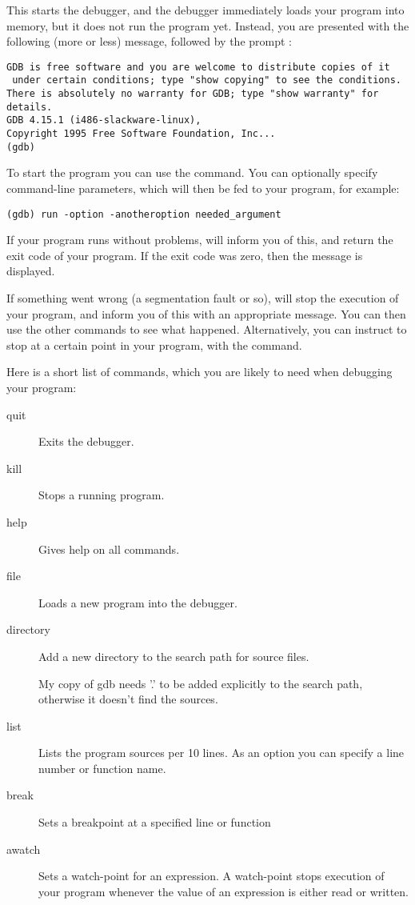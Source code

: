 This starts the debugger, and the debugger immediately loads your program
into memory, but it does not run the program yet. Instead, you are presented
with the following (more or less) message, followed by the  prompt
:
\begin{verbatim}
GDB is free software and you are welcome to distribute copies of it
 under certain conditions; type "show copying" to see the conditions.
There is absolutely no warranty for GDB; type "show warranty" for details.
GDB 4.15.1 (i486-slackware-linux),
Copyright 1995 Free Software Foundation, Inc...
(gdb)
\end{verbatim}
To start the program you can use the  command. You can optionally
specify command-line parameters, which will then be fed to your program, for
example:
\begin{verbatim}
(gdb) run -option -anotheroption needed_argument
\end{verbatim}
If your program runs without problems,  will inform you of this,
and return the exit code of your program. If the exit code was zero, then
the message  is displayed.

If something went wrong (a segmentation fault or so),  will stop
the execution of your program, and inform you of this with an appropriate
message. You can then use the other  commands to see what happened.
Alternatively, you can instruct  to stop at a certain point in your
program, with the  command.

Here is a short list of  commands, which you are likely to need when
debugging your program:
\begin{description}
\item [quit\ ] Exits the debugger.
\item [kill\ ] Stops a running program.
\item [help\ ] Gives help on all  commands.
\item [file\ ] Loads a new program into the debugger.
\item [directory\ ] Add a new directory to the search path for source
files.\\
\begin{remark} My copy of gdb needs '.' to be added explicitly to the search
path, otherwise it doesn't find the sources.
\end{remark}
\item [list\ ] Lists the program sources per 10 lines. As an option you can
specify a line number or function name.
\item [break\ ] Sets a breakpoint at a specified line or function
\item [awatch\ ] Sets a watch-point for an expression. A watch-point stops
execution of your program whenever the value of an expression is either
read or written.
\end{description}

